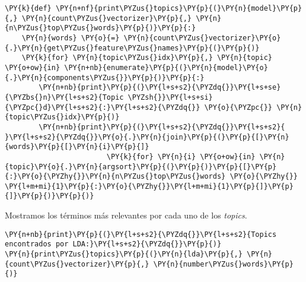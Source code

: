     \begin{tcolorbox}[breakable, size=fbox, boxrule=1pt, pad at break*=1mm,colback=cellbackground, colframe=cellborder]
\begin{Verbatim}[commandchars=\\\{\}]
\PY{k}{def} \PY{n+nf}{print\PYZus{}topics}\PY{p}{(}\PY{n}{model}\PY{p}{,} \PY{n}{count\PYZus{}vectorizer}\PY{p}{,} \PY{n}{n\PYZus{}top\PYZus{}words}\PY{p}{)}\PY{p}{:}
    \PY{n}{words} \PY{o}{=} \PY{n}{count\PYZus{}vectorizer}\PY{o}{.}\PY{n}{get\PYZus{}feature\PYZus{}names}\PY{p}{(}\PY{p}{)}
    \PY{k}{for} \PY{n}{topic\PYZus{}idx}\PY{p}{,} \PY{n}{topic} \PY{o+ow}{in} \PY{n+nb}{enumerate}\PY{p}{(}\PY{n}{model}\PY{o}{.}\PY{n}{components\PYZus{}}\PY{p}{)}\PY{p}{:}
        \PY{n+nb}{print}\PY{p}{(}\PY{l+s+s2}{\PYZdq{}}\PY{l+s+se}{\PYZbs{}n}\PY{l+s+s2}{Topic \PYZsh{}}\PY{l+s+si}{\PYZpc{}d}\PY{l+s+s2}{:}\PY{l+s+s2}{\PYZdq{}} \PY{o}{\PYZpc{}} \PY{n}{topic\PYZus{}idx}\PY{p}{)}
        \PY{n+nb}{print}\PY{p}{(}\PY{l+s+s2}{\PYZdq{}}\PY{l+s+s2}{ }\PY{l+s+s2}{\PYZdq{}}\PY{o}{.}\PY{n}{join}\PY{p}{(}\PY{p}{[}\PY{n}{words}\PY{p}{[}\PY{n}{i}\PY{p}{]}
                        \PY{k}{for} \PY{n}{i} \PY{o+ow}{in} \PY{n}{topic}\PY{o}{.}\PY{n}{argsort}\PY{p}{(}\PY{p}{)}\PY{p}{[}\PY{p}{:}\PY{o}{\PYZhy{}}\PY{n}{n\PYZus{}top\PYZus{}words} \PY{o}{\PYZhy{}} \PY{l+m+mi}{1}\PY{p}{:}\PY{o}{\PYZhy{}}\PY{l+m+mi}{1}\PY{p}{]}\PY{p}{]}\PY{p}{)}\PY{p}{)}
\end{Verbatim}
\end{tcolorbox}

Mostramos los términos más relevantes por cada uno de los \textit{topics}. 
\vspace{0.5cm}
    \begin{tcolorbox}[breakable, size=fbox, boxrule=1pt, pad at break*=1mm,colback=cellbackground, colframe=cellborder]
\begin{Verbatim}[commandchars=\\\{\}]
\PY{n+nb}{print}\PY{p}{(}\PY{l+s+s2}{\PYZdq{}}\PY{l+s+s2}{Topics encontrados por LDA:}\PY{l+s+s2}{\PYZdq{}}\PY{p}{)}
\PY{n}{print\PYZus{}topics}\PY{p}{(}\PY{n}{lda}\PY{p}{,} \PY{n}{count\PYZus{}vectorizer}\PY{p}{,} \PY{n}{number\PYZus{}words}\PY{p}{)}
\end{Verbatim}
\end{tcolorbox}

